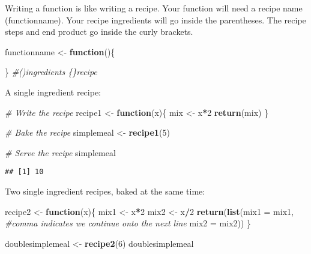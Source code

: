 \documentclass[]{article}
\newenvironment{Shaded}{\begin{snugshade}}{\end{snugshade}}
\newcommand{\KeywordTok}[1]{\textcolor[rgb]{0.13,0.29,0.53}{\textbf{#1}}}
\newcommand{\DataTypeTok}[1]{\textcolor[rgb]{0.13,0.29,0.53}{#1}}
\newcommand{\DecValTok}[1]{\textcolor[rgb]{0.00,0.00,0.81}{#1}}
\newcommand{\StringTok}[1]{\textcolor[rgb]{0.31,0.60,0.02}{#1}}
\newcommand{\CommentTok}[1]{\textcolor[rgb]{0.56,0.35,0.01}{\textit{#1}}}
\newcommand{\ControlFlowTok}[1]{\textcolor[rgb]{0.13,0.29,0.53}{\textbf{#1}}}
\newcommand{\OperatorTok}[1]{\textcolor[rgb]{0.81,0.36,0.00}{\textbf{#1}}}
\newcommand{\NormalTok}[1]{#1}
\begin{document}
Writing a function is like writing a recipe. Your function will need a
recipe name (functionname). Your recipe ingredients will go inside the
parentheses. The recipe steps and end product go inside the curly
brackets.

\begin{Shaded}
\begin{Highlighting}[]
\NormalTok{functionname <-}\StringTok{ }\ControlFlowTok{function}\NormalTok{()\{}
  
\NormalTok{\}}
\CommentTok{#()ingredients \{\}recipe}
\end{Highlighting}
\end{Shaded}

A single ingredient recipe:

\begin{Shaded}
\begin{Highlighting}[]
\CommentTok{# Write the recipe}
\NormalTok{recipe1 <-}\StringTok{ }\ControlFlowTok{function}\NormalTok{(x)\{}
\NormalTok{  mix <-}\StringTok{ }\NormalTok{x}\OperatorTok{*}\DecValTok{2}
  \KeywordTok{return}\NormalTok{(mix)}
\NormalTok{\}}

\CommentTok{# Bake the recipe}
\NormalTok{simplemeal <-}\StringTok{ }\KeywordTok{recipe1}\NormalTok{(}\DecValTok{5}\NormalTok{)}

\CommentTok{# Serve the recipe}
\NormalTok{simplemeal}
\end{Highlighting}
\end{Shaded}

\begin{verbatim}
## [1] 10
\end{verbatim}

Two single ingredient recipes, baked at the same time:

\begin{Shaded}
\begin{Highlighting}[]
\NormalTok{recipe2 <-}\StringTok{ }\ControlFlowTok{function}\NormalTok{(x)\{}
\NormalTok{  mix1 <-}\StringTok{ }\NormalTok{x}\OperatorTok{*}\DecValTok{2}
\NormalTok{  mix2 <-}\StringTok{ }\NormalTok{x}\OperatorTok{/}\DecValTok{2}
  \KeywordTok{return}\NormalTok{(}\KeywordTok{list}\NormalTok{(}\DataTypeTok{mix1 =}\NormalTok{ mix1, }\CommentTok{#comma indicates we continue onto the next line}
              \DataTypeTok{mix2 =}\NormalTok{ mix2))}
\NormalTok{\}}

\NormalTok{doublesimplemeal <-}\StringTok{ }\KeywordTok{recipe2}\NormalTok{(}\DecValTok{6}\NormalTok{)}
\NormalTok{doublesimplemeal}
\end{Highlighting}
\end{Shaded}
\end{document}
